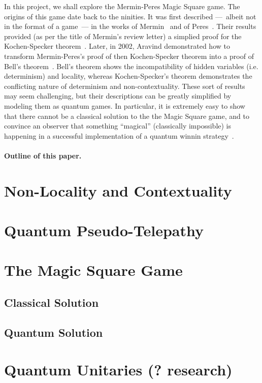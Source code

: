 \documentclass{llncs}
\begin{document}
In this project, we shall explore the Mermin-Peres Magic
Square game. The origins of this game date back to the
ninities. It was first described ---~albeit not in the format of a
game~--- in the works of Mermin~\cite{mermin:1990} and of
Peres~\cite{peres:1990}. Their results provided (as per the
title of Mermin's review letter) a simplied proof for the
Kochen-Specker theorem~\cite{Kocher1975}. Later, in 2002,
Aravind demonstrated how to transform Mermin-Peres's proof
of then Kochen-Specker theorem into a proof of Bell's
theorem~\cite{aravind:xxx}. Bell's theorem shows the
incompatibility of hidden variables (i.e. determinism) and
locality, whereas Kochen-Specker's theorem demonstrates the
conflicting nature of determinism and non-contextuality.
These sort of results may seem challenging, but their
descriptions can be greatly simplified by modeling them as
quantum games.  In particular, it is extremely easy to show
that there cannot be a classical solution to the the Magic
Square game, and to convince an observer that something
``magical'' (classically impossible) is happening in a
successful implementation of a quantum winnin
strategy~\cite{brassard:2005}.

\paragraph{Outline of this paper.}
\section{Non-Locality and Contextuality}
\label{sec:local-context}


\section{Quantum Pseudo-Telepathy}
\label{sec:telepathy}

\section{The Magic Square Game}
\label{sec:magic-square}

\subsection{Classical Solution}
\label{sec:classic-sol}

\subsection{Quantum Solution}
\label{sec:quantum-sol}

\section{Quantum Unitaries (? research)}
\label{sec:quantum-unitaries}

\printbibliography{}
\end{document}
